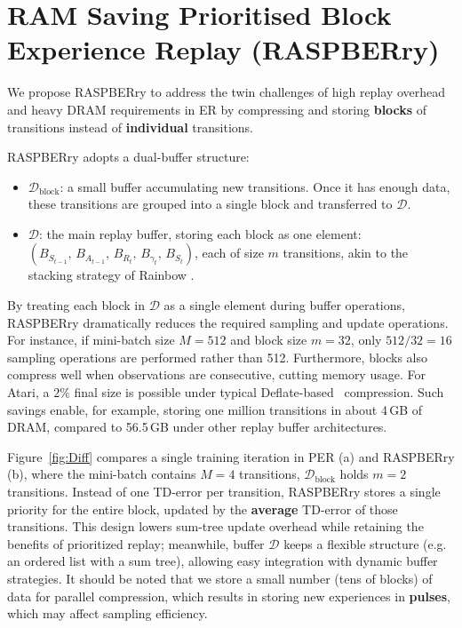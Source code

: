 \documentclass[10pt]{article} %
\begin{document}
\section{RAM Saving Prioritised Block Experience Replay (RASPBERry)}\label{sec:contribution}
We propose RASPBERry to address the twin challenges of high replay overhead and heavy DRAM requirements in ER by compressing and storing \textbf{blocks} of transitions instead of \textbf{individual} transitions.

RASPBERry adopts a dual-buffer structure: 
\begin{itemize}[leftmargin=*]
    \item $\mathcal{D}_{\text{block}}$: a small buffer accumulating new transitions.
    Once it has enough data, these transitions are grouped into a single block and transferred to $\mathcal{D}$.
    \item $\mathcal{D}$: the main replay buffer, storing each block as one element: $(B_{S_{t-1}},\, B_{A_{t-1}},\, B_{R_t},\, B_{\gamma_t},\, B_{S_t})$, each of size $m$ transitions, akin to the stacking strategy of Rainbow \citep{RainbowCombiningImprovements_hessel_2017}.
\end{itemize}

By treating each block in $\mathcal{D}$ as a single element during buffer operations, RASPBERry dramatically reduces the required sampling and update operations.
For instance, if mini-batch size $M=512$ and block size $m=32$, only $512/32=16$ sampling operations are performed rather than 512.
Furthermore, blocks also compress well when observations are consecutive, cutting memory usage.
For Atari, a $2\%$ final size is possible under typical Deflate-based~\citep{DEFLATECompressedData_deutsch_1996} compression.
Such savings enable, for example, storing one million transitions in about 4\,GB of DRAM, compared to 56.5\,GB under other replay buffer architectures.

Figure~\ref{fig:Diff} compares a single training iteration in PER (a) and RASPBERry (b), where the mini-batch contains $M = 4$ transitions, $\mathcal{D}_{\text{block}}$ holds $m = 2$ transitions.
Instead of one TD-error per transition, RASPBERry stores a single priority for the entire block, updated by the \textbf{average} TD-error of those transitions.  
This design lowers sum-tree update overhead while retaining the benefits of prioritized replay; meanwhile, buffer $\mathcal{D}$ keeps a flexible structure (e.g. an ordered list with a sum tree), allowing easy integration with dynamic buffer strategies.
It should be noted that we store a small number (tens of blocks) of data for parallel compression, which results in storing new experiences in \textbf{pulses}, which may affect sampling efficiency.
\end{document}

